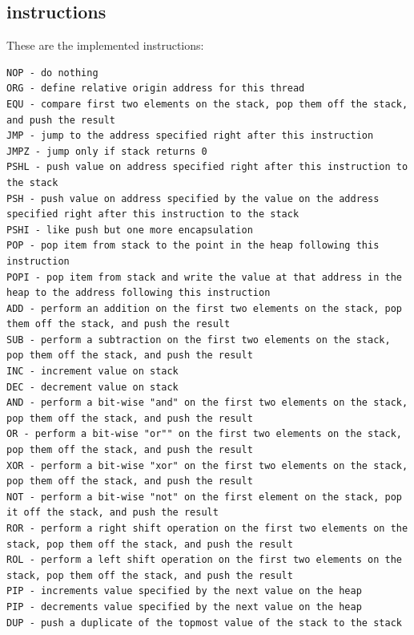 \documentclass[letterpaper, 12pt]{article}
\begin{document}
\subsection{instructions} 
\label{sub:instructions}


These are the implemented instructions:

\begin{Verbatim}[fontfamily=courier, xleftmargin=\parindent]
NOP - do nothing
ORG - define relative origin address for this thread
EQU - compare first two elements on the stack, pop them off the stack, and push the result
JMP - jump to the address specified right after this instruction
JMPZ - jump only if stack returns 0
PSHL - push value on address specified right after this instruction to the stack
PSH - push value on address specified by the value on the address specified right after this instruction to the stack
PSHI - like push but one more encapsulation
POP - pop item from stack to the point in the heap following this instruction
POPI - pop item from stack and write the value at that address in the heap to the address following this instruction
ADD - perform an addition on the first two elements on the stack, pop them off the stack, and push the result
SUB - perform a subtraction on the first two elements on the stack, pop them off the stack, and push the result
INC - increment value on stack
DEC - decrement value on stack
AND - perform a bit-wise "and" on the first two elements on the stack, pop them off the stack, and push the result
OR - perform a bit-wise "or"" on the first two elements on the stack, pop them off the stack, and push the result
XOR - perform a bit-wise "xor" on the first two elements on the stack, pop them off the stack, and push the result
NOT - perform a bit-wise "not" on the first element on the stack, pop it off the stack, and push the result
ROR - perform a right shift operation on the first two elements on the stack, pop them off the stack, and push the result
ROL - perform a left shift operation on the first two elements on the stack, pop them off the stack, and push the result
PIP - increments value specified by the next value on the heap
PIP - decrements value specified by the next value on the heap
DUP - push a duplicate of the topmost value of the stack to the stack
\end{Verbatim}
\end{document}
